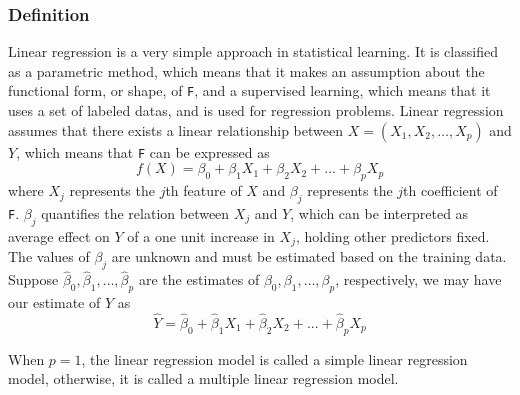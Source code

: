 \documentclass[conf]{new-aiaa}
\begin{document}
\subsubsection{Definition}
Linear regression is a very simple approach in statistical learning. It is classified as a parametric method, which means that it makes an assumption about the functional form, or shape, of \texttt{F}, and a supervised learning, which means that it uses a set of labeled datas, and is used for regression problems. Linear regression assumes that there exists a linear relationship between $X = (X_1, X_2, \dots, X_p)$ and $Y$, which means that \texttt{F} can be expressed as
\begin{equation} \label{eq:linmod}
    f(X) = \beta_0 + \beta_1X_1 + \beta_2X_2 + ... + \beta_pX_p
\end{equation}
where $X_j$ represents the $j$th feature of $X$ and $\beta_j$ represents the $j$th coefficient of \texttt{F}. $\beta_j$ quantifies the relation between $X_j$ and $Y$, which can be interpreted as average effect on $Y$ of a one unit increase in $X_j$, holding other predictors fixed. The values of $\beta_j$ are unknown and must be estimated based on the training data. Suppose $\hat{\beta}_0, \hat{\beta}_1, \dots, \hat{\beta}_p$ are the estimates of $\beta_0, \beta_1, \dots, \beta_p$, respectively, we may have our estimate of $Y$ as
\begin{equation} \label{eq:linreg}
    \hat{Y} = \hat{\beta}_0 + \hat{\beta}_1X_1 + \hat{\beta}_2X_2 + ... + \hat{\beta}_pX_p
\end{equation}

When $p = 1$, the linear regression model is called a simple linear regression model, otherwise, it is called a multiple linear regression model.
\end{document}
